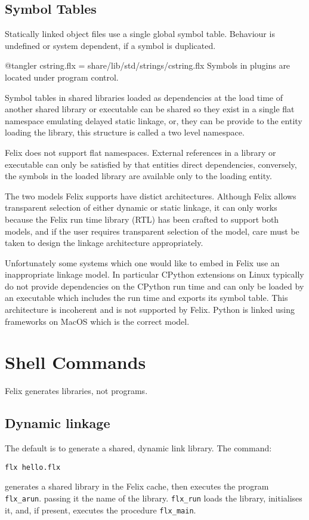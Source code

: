 \documentclass[oneside]{book}
\begin{document}
\section{Symbol Tables}
Statically linked object files use a single global symbol
table. Behaviour is undefined or system dependent,
if a symbol is duplicated.

@tangler cstring.flx = share/lib/std/strings/cstring.flx
Symbols in plugins are located under program control.

Symbol tables in shared libraries loaded as dependencies
at the load time of another shared library or executable
can be shared so they exist in a single flat namespace
emulating delayed static linkage, or, they can be provide
to the entity loading the library, this structure
is called a two level namespace.

Felix does not support flat namespaces. External references
in a library or executable can only be satisfied by 
that entities direct dependencies, conversely, the symbols
in the loaded library are available only to the loading
entity.

The two models Felix supports have distict architectures.
Although Felix allows transparent selection of either
dynamic or static linkage, it can only works because the Felix
run time library (RTL) has been crafted to support both
models, and if the user requires transparent selection
of the model, care must be taken to design the linkage
architecture appropriately.

Unfortunately some systems which one would like to embed
in Felix use an inappropriate linkage model. In particular
CPython extensions on Linux typically do not provide dependencies
on the CPython run time and can only be loaded by an executable
which includes the run time and exports its symbol table.
This architecture is incoherent and is not supported by Felix.
Python is linked using frameworks on MacOS which is the correct
model.



\chapter{Shell Commands}
Felix generates libraries, not programs.
\section{Dynamic linkage}
The default is to generate a shared, dynamic link library.
The command:
\begin{verbatim}
flx hello.flx
\end{verbatim}
generates a shared library in the Felix cache, then executes the
program \verb$flx_arun$. passing it the name of the library.
\verb$flx_run$ loads the library, initialises it, and, if present,
executes the procedure \verb$flx_main$.
\end{document}
